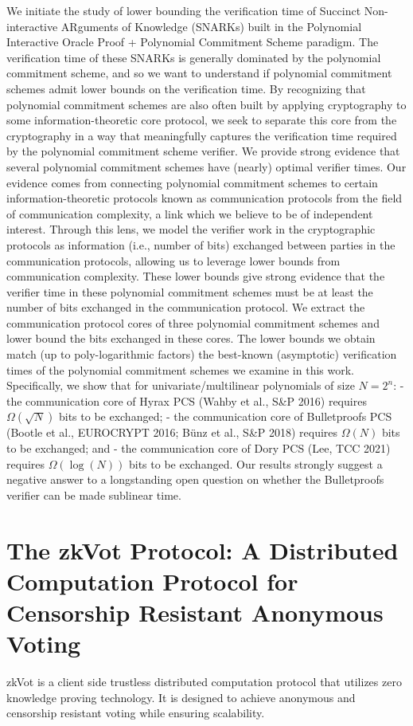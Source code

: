 \documentclass[11pt]{article}
\theoremstyle{definition}
\theoremstyle{remark}
\theoremstyle{plain}
\begin{document}
We initiate the study of lower bounding the verification time of Succinct Non-interactive ARguments of Knowledge (SNARKs) built in the Polynomial Interactive Oracle Proof + Polynomial Commitment Scheme paradigm. The verification time of these SNARKs is generally dominated by the polynomial commitment scheme, and so we want to understand if polynomial commitment schemes admit lower bounds on the verification time. By recognizing that polynomial commitment schemes are also often built by applying cryptography to some information-theoretic core protocol, we seek to separate this core from the cryptography in a way that meaningfully captures the verification time required by the polynomial commitment scheme verifier. We provide strong evidence that several polynomial commitment schemes have (nearly) optimal verifier times. Our evidence comes from connecting polynomial commitment schemes to certain information-theoretic protocols known as communication protocols from the field of communication complexity, a link which we believe to be of independent interest. Through this lens, we model the verifier work in the cryptographic protocols as information (i.e., number of bits) exchanged between parties in the communication protocols, allowing us to leverage lower bounds from communication complexity. These lower bounds give strong evidence that the verifier time in these polynomial commitment schemes must be at least the number of bits exchanged in the communication protocol. We extract the communication protocol cores of three polynomial commitment schemes and lower bound the bits exchanged in these cores. The lower bounds we obtain match (up to poly-logarithmic factors) the best-known (asymptotic) verification times of the polynomial commitment schemes we examine in this work. Specifically, we show that for univariate/multilinear polynomials of size $N=2^n$: - the communication core of Hyrax PCS (Wahby et al., S\&P 2016) requires $\Omega(\sqrt{N})$ bits to be exchanged; - the communication core of Bulletproofs PCS (Bootle et al., EUROCRYPT 2016; Bünz et al., S\&P 2018) requires $\Omega(N)$ bits to be exchanged; and - the communication core of Dory PCS (Lee, TCC 2021) requires $\Omega(\log(N))$ bits to be exchanged. Our results strongly suggest a negative answer to a longstanding open question on whether the Bulletproofs verifier can be made sublinear time.

\section{\cite{cryptoeprint:2025/1709} The zkVot Protocol: A Distributed Computation Protocol for Censorship Resistant Anonymous Voting}
zkVot is a client side trustless distributed computation protocol that utilizes zero knowledge proving technology. It is designed to achieve anonymous and censorship resistant voting while ensuring scalability.
\end{document}
